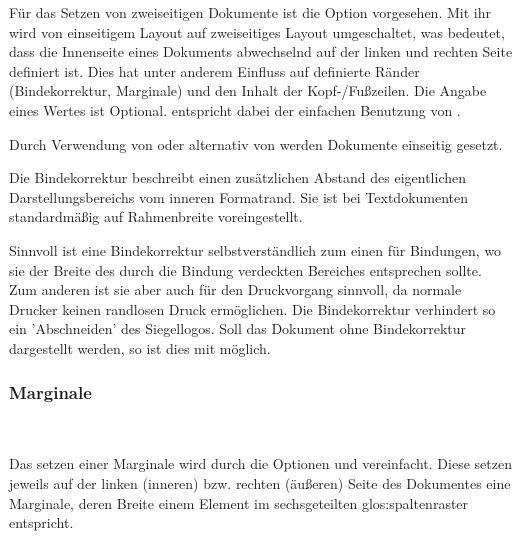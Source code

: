 Für das Setzen von zweiseitigen Dokumente ist die Option 
vorgesehen. Mit ihr wird von einseitigem Layout auf zweiseitiges Layout
umgeschaltet, was bedeutet, dass die Innenseite eines Dokuments abwechselnd
auf der linken und rechten Seite definiert ist. Dies hat unter anderem Einfluss
auf definierte Ränder (Bindekorrektur, Marginale) und den Inhalt der
Kopf-/Fußzeilen.
Die Angabe eines Wertes ist Optional.  entspricht
dabei der einfachen Benutzung von .

Durch Verwendung von  oder alternativ
von  werden Dokumente einseitig gesetzt.

\begin{Declaration}
\end{Declaration}

Die Bindekorrektur beschreibt einen zusätzlichen Abstand des eigentlichen
Darstellungsbereichs vom inneren Formatrand.
Sie ist bei Textdokumenten standardmäßig auf Rahmenbreite voreingestellt.

Sinnvoll ist eine Bindekorrektur selbstverständlich zum einen für Bindungen,
wo sie der Breite des durch die Bindung verdeckten Bereiches entsprechen sollte.
Zum anderen ist sie aber auch für den Druckvorgang sinnvoll, da normale Drucker
keinen randlosen Druck ermöglichen.
Die Bindekorrektur verhindert so \zB ein 'Abschneiden' des Siegellogos.
Soll das Dokument ohne Bindekorrektur dargestellt werden, so ist dies
mit  möglich.

\subsubsection{Marginale}

\vspace*{-6mm}
\begin{Declaration}
  \\
\end{Declaration}

Das setzen einer Marginale wird durch die Optionen  und
 vereinfacht. Diese setzen jeweils auf der linken (inneren)
bzw. rechten (äußeren) Seite des Dokumentes eine Marginale, deren Breite
einem Element im sechsgeteilten \gls{glos:spaltenraster} entspricht.

